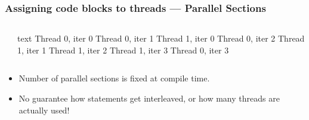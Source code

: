 \documentclass[handout]{beamer}
\begin{document}
\begin{frame}[fragile]
  \frametitle{Assigning code blocks to threads --- Parallel Sections}
  \begin{columns}[t]%
    \begin{column}{0.65\textwidth}
    \end{column}
    \pause
    \begin{column}{0.4\textwidth}
      \begin{ccode}[]
        {text}
        Thread 0, iter 0
        Thread 0, iter 1
          Thread 1, iter 0
        Thread 0, iter 2
          Thread 1, iter 1
          Thread 1, iter 2
          Thread 1, iter 3
        Thread 0, iter 3\end{ccode}
    \end{column}
  \end{columns}
  \pause
  \begin{itemize}
  \item Number of parallel sections is fixed at compile time.
  \item No guarantee how statements get interleaved, or how many threads are actually used!
  \end{itemize}
\end{frame}
\end{document}

